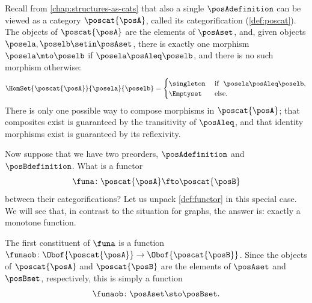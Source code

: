 Recall from \cref{chap:structures-as-cats} that also a single  $\posAdefinition$ can be viewed as a category $\poscat{\posA}$, called its categorification (\cref{def:poscat}).
The objects of $\poscat{\posA}$ are the elements of $\posAset$, and, given objects $\posela, \poselb \setin \posAset$, there is exactly one morphism $\posela \mto \poselb$ if $\posela \posAleq \poselb$, and there is no such morphism otherwise:
\begin{equation}
    \label{eq:poscat-homsets-recalled}
    \HomSet{\poscat{\posA}}{\posela}{\poselb} =
    \begin{cases}
        \singleton & \text{ if }  \ \posela \posAleq \poselb, \\
        \Emptyset  & \text{ else. }
    \end{cases}
\end{equation}
There is only one possible way to compose morphisms in $\poscat{\posA}$; that composites exist is guaranteed by the transitivity of $\posAleq$, and that identity morphisms exist is guaranteed by its reflexivity.

Now suppose that we have two preorders, $\posAdefinition$ and $\posBdefinition$.
What is a functor
\begin{equation}
    \funa \colon \poscat{\posA} \fto \poscat{\posB}
\end{equation}
between their categorifications?
Let us unpack \cref{def:functor} in this special case.
We will see that, in contrast to the situation for graphs, the answer is: exactly a monotone function.

The first constituent of $\funa$ is a function $\funaob \colon \Obof{\poscat{\posA}} \to \Obof{\poscat{\posB}}$.
Since the objects of $\poscat{\posA}$ and $\poscat{\posB}$ are the elements of $\posAset$ and $\posBset$, respectively, this is simply a function
\begin{equation}
    \funaob \colon \posAset \sto \posBset.
\end{equation}

